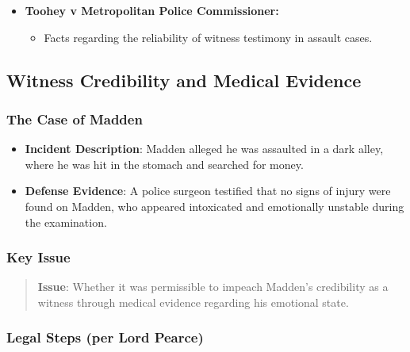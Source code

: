 \begin{itemize}
\tightlist
\item
  \textbf{Toohey v Metropolitan Police Commissioner:}

  \begin{itemize}
  \tightlist
  \item
    Facts regarding the reliability of witness testimony in assault
    cases.
  \end{itemize}
\end{itemize}

\subsection{  Witness Credibility and Medical
Evidence}\label{witness-credibility-and-medical-evidence}

\subsubsection{The Case of Madden}\label{the-case-of-madden}

\begin{itemize}
\tightlist
\item
  \textbf{Incident Description}: Madden alleged he was assaulted in a
  dark alley, where he was hit in the stomach and searched for money.
\item
  \textbf{Defense Evidence}: A police surgeon testified that no signs of
  injury were found on Madden, who appeared intoxicated and emotionally
  unstable during the examination.
\end{itemize}

\subsubsection{Key Issue}\label{key-issue}

\begin{quote}
\textbf{Issue}: Whether it was permissible to impeach Madden's
credibility as a witness through medical evidence regarding his
emotional state.
\end{quote}

\subsubsection{Legal Steps (per Lord
Pearce)}\label{legal-steps-per-lord-pearce}

